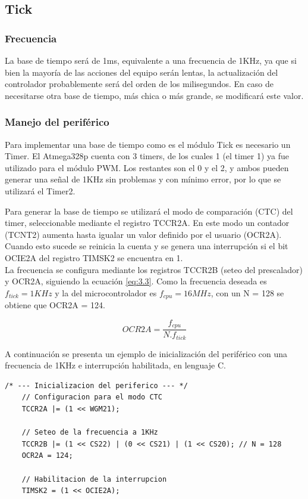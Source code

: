 \subsection{Tick}
\subsubsection{Frecuencia}
La base de tiempo será de 1ms, equivalente a una frecuencia de 1KHz, ya que si bien la mayoría de las acciones del equipo serán lentas, la actualización del controlador probablemente será del orden de los milisegundos. En caso de necesitarse otra base de tiempo, más chica o más grande, se modificará este valor.

\subsubsection{Manejo del periférico}
Para implementar una base de tiempo como es el módulo Tick es necesario un Timer. El Atmega328p cuenta con 3 timers, de los cuales 1 (el timer 1) ya fue utilizado para el módulo PWM. Los restantes son el 0 y el 2, y ambos pueden generar una señal de 1KHz sin problemas y con mínimo error, por lo que se utilizará el Timer2.

Para generar la base de tiempo se utilizará el modo de comparación (CTC) del timer, seleccionable mediante el registro TCCR2A. En este modo un contador (TCNT2) aumenta hasta igualar un valor definido por el usuario (OCR2A). Cuando esto sucede se reinicia la cuenta y se genera una interrupción si el bit OCIE2A del registro TIMSK2 se encuentra en 1.\\
La frecuencia se configura mediante los registros TCCR2B (seteo del prescalador) y OCR2A, siguiendo la ecuación \ref{eq:3.3}. Como la frecuencia deseada es \(f_{tick} = 1KHz\) y la del microcontrolador es \(f_{cpu} = 16MHz\), con un N = 128 se obtiene que OCR2A = 124.

\begin{equation} \label{eq:\theequation}
OCR2A = \frac{f_{cpu}}{N.f_{tick}}
\end{equation}

A continuación se presenta un ejemplo de inicialización del periférico con una frecuencia de 1KHz e interrupción habilitada, en lenguaje C.

\begin{lstlisting}[style=CStyle]
	/* --- Inicializacion del periferico --- */
	// Configuracion para el modo CTC
	TCCR2A |= (1 << WGM21);
	
	// Seteo de la frecuencia a 1KHz
	TCCR2B |= (1 << CS22) | (0 << CS21) | (1 << CS20); // N = 128
	OCR2A = 124;
	
	// Habilitacion de la interrupcion
	TIMSK2 = (1 << OCIE2A);
\end{lstlisting}

